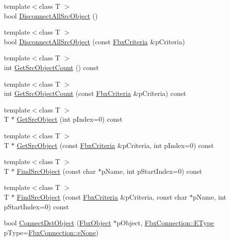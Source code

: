 \begin{Indent}
\begin{DoxyCompactItemize}
\item 
{\footnotesize template$<$class T $>$ }\\bool \hyperlink{class_fbx_object_a17f59548a86067094c17501801e7aa46}{Disconnect\+All\+Src\+Object} ()
\item 
{\footnotesize template$<$class T $>$ }\\bool \hyperlink{class_fbx_object_ae5b578e810b22bcd8d0df323097ed995}{Disconnect\+All\+Src\+Object} (const \hyperlink{class_fbx_criteria}{Fbx\+Criteria} \&p\+Criteria)
\item 
{\footnotesize template$<$class T $>$ }\\int \hyperlink{class_fbx_object_a9da9f905564dc108d1363049eb032fa8}{Get\+Src\+Object\+Count} () const
\item 
{\footnotesize template$<$class T $>$ }\\int \hyperlink{class_fbx_object_aabefdc2922a216fb7a1ce864fcf2438a}{Get\+Src\+Object\+Count} (const \hyperlink{class_fbx_criteria}{Fbx\+Criteria} \&p\+Criteria) const
\item 
{\footnotesize template$<$class T $>$ }\\T $\ast$ \hyperlink{class_fbx_object_a82874616164464f8b68c6ceeb78a45db}{Get\+Src\+Object} (int p\+Index=0) const
\item 
{\footnotesize template$<$class T $>$ }\\T $\ast$ \hyperlink{class_fbx_object_a8a4458e4c75a797792f25ccc9a0e5ae1}{Get\+Src\+Object} (const \hyperlink{class_fbx_criteria}{Fbx\+Criteria} \&p\+Criteria, int p\+Index=0) const
\item 
{\footnotesize template$<$class T $>$ }\\T $\ast$ \hyperlink{class_fbx_object_a547e52c46c5018dbc0118ffbb67da596}{Find\+Src\+Object} (const char $\ast$p\+Name, int p\+Start\+Index=0) const
\item 
{\footnotesize template$<$class T $>$ }\\T $\ast$ \hyperlink{class_fbx_object_a68056060554e854e9783f5d1f79403a5}{Find\+Src\+Object} (const \hyperlink{class_fbx_criteria}{Fbx\+Criteria} \&p\+Criteria, const char $\ast$p\+Name, int p\+Start\+Index=0) const
\item 
bool \hyperlink{class_fbx_object_a3c7e883121fe1ceb271381146bd52ed0}{Connect\+Dst\+Object} (\hyperlink{class_fbx_object}{Fbx\+Object} $\ast$p\+Object, \hyperlink{class_fbx_connection_a3df448a5db356652ab99fd2be2553749}{Fbx\+Connection\+::\+E\+Type} p\+Type=\hyperlink{class_fbx_connection_a3df448a5db356652ab99fd2be2553749a47aa04870c3c0769263e3972e67e9ebe}{Fbx\+Connection\+::e\+None})

\end{DoxyCompactItemize}
\end{Indent}
